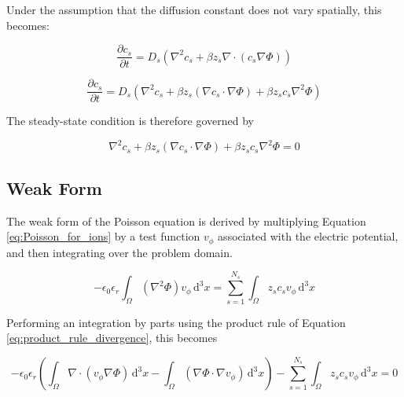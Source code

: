 Under the assumption that the diffusion constant does not vary spatially,
this becomes:

\begin{equation}
  \frac{\partial c_s}{\partial t} = 
  D_s \left( \nabla^2 c_s + \beta z_s \nabla \cdot \left( c_s \nabla \Phi \right) \right)
\end{equation}

\begin{equation}\label{eq:PNP_timedep}
  \boxed{
    \frac{\partial c_s}{\partial t} = 
    D_s \left( \nabla^2 c_s + \beta z_s \left( \nabla c_s \cdot \nabla \Phi \right)  + \beta z_s c_s \nabla^2 \Phi \right)
  }
\end{equation}

The steady-state condition is therefore governed by

\begin{equation}\label{eq:PNP_steady_state_gov}
  \boxed{
    \nabla^2 c_s + \beta z_s \left( \nabla c_s \cdot \nabla \Phi \right)  + \beta z_s c_s \nabla^2 \Phi = 0
  }
\end{equation}


\subsection{Weak Form}\label{subsec:unhom_pnp_weak}

The weak form of the Poisson equation is derived by multiplying
Equation \ref{eq:Poisson_for_ions} by a test function $v_\phi$
associated with the electric potential,
and then integrating over the problem domain.

\begin{equation}
  -\epsilon_{0}\epsilon_{r} \int_\Omega \left( \nabla^2 \Phi \right) v_\phi \,\mathrm{d}^3x
   = \sum_{s=1}^{N_s} \int_\Omega z_s c_s v_\phi \,\mathrm{d}^3x
\end{equation}

Performing an integration by parts using the product rule
of Equation \ref{eq:product_rule_divergence}, this becomes

\begin{equation}
  -\epsilon_{0}\epsilon_{r}
  \left( \int_\Omega \nabla \cdot \left( v_\phi \nabla \Phi \right) \,\mathrm{d}^3x
  - \int_\Omega  \left( \nabla \Phi \cdot \nabla v_\phi \right) \,\mathrm{d}^3x \right)
  - \sum_{s=1}^{N_s} \int_\Omega z_s c_s v_\phi \,\mathrm{d}^3x = 0
\end{equation}

